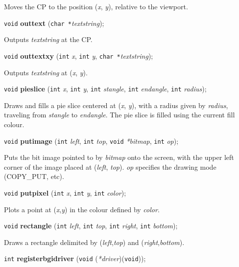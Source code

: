 \documentclass[a4paper,11pt]{article}
\newcommand{\V}{\texttt{void}}      %
\newcommand{\I}{\texttt{int}}       %
\newcommand{\C}{\texttt{char *}}    %
\newcommand{\func}[1]{\textbf{#1}}  %
\newcommand{\A}[1]{\emph{#1}}       %
\newenvironment{bgi}
{ %
  \begin{snugshade}
}
{ %
  \end{snugshade}
}
\begin{document}
Moves the CP to the position (\A{x}, \A{y}), relative to the
viewport.


\begin{bgi}
\V{} \func{outtext} (\C{}\A{textstring});
\end{bgi}

Outputs \A{textstring} at the CP.


\begin{bgi}
\V{} \func{outtextxy} (\I{} \A{x}, \I{} \A{y}, \C{}\A{textstring});
\end{bgi}

Outputs \A{textstring} at (\A{x}, \A{y}).


\begin{bgi}
\V{} \func{pieslice} (\I{} \A{x}, \I{} \A{y}, \I{} \A{stangle}, \I{}
\A{endangle}, \I{} \A{radius});
\end{bgi}

Draws and fills a pie slice centered at (\A{x}, \A{y}), with a radius
given by \A{radius}, traveling from \A{stangle} to \A{endangle}. The
pie slice is filled using the current fill colour.


\begin{bgi}
\V{} \func{putimage} (\I{} \A{left}, \I{} \A{top}, \V{} \A{*bitmap},
\I{} \A{op});
\end{bgi}

Puts the bit image pointed to by \A{bitmap} onto the screen, with the
upper left corner of the image placed at (\A{left}, \A{top}). \A{op}
specifies the drawing mode (COPY\_PUT, etc).


\begin{bgi}
\V{} \func{putpixel} (\I{} \A{x}, \I{} \A{y}, \I{} \A{color}); 
\end{bgi}

Plots a point at (\A{x},\A{y}) in the colour defined by \A{color}.


\begin{bgi}
\V{} \func{rectangle} (\I{} \A{left}, \I{} \A{top}, \I{} \A{right},
\I{} \A{bottom});
\end{bgi}

Draws a rectangle delimited by (\A{left},\A{top}) and
(\A{right},\A{bottom}).


\begin{bgi}
\I{} \func{registerbgidriver} (\V{} (\A{*driver})(\V{})); 
\end{bgi}
\end{document}
